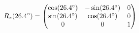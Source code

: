 \documentclass[preview]{standalone}
\begin{document}
\begin{align*}
\special{dvisvgm:raw <g id='unique000'>}R_z(26.4^\circ) = \begin{pmatrix} \cos(26.4^\circ) & -\sin(26.4^\circ) & 0 \\ \sin(26.4^\circ) & \cos(26.4^\circ) & 0 \\ 0 & 0 & 1 \end{pmatrix}\special{dvisvgm:raw </g>}
\end{align*}
\end{document}
